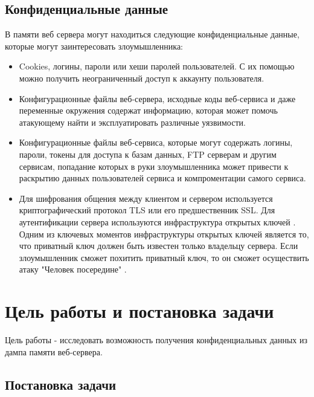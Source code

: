 \documentclass[20pt]{article}
\begin{document}
\subsection{Конфиденциальные данные}

В памяти веб сервера могут находиться следующие конфиденциальные данные, которые
могут заинтересовать злоумышленника:

\begin{itemize}

  \item Cookies, логины, пароли или хеши паролей пользователей. С их
  помощью можно получить неограниченный доступ к аккаунту пользователя.

  \item Конфигурационные файлы веб-сервера, исходные коды веб-сервиса и даже переменные
  окружения содержат информацию, которая может помочь атакующему найти и
  эксплуатировать различные уязвимости.

  \item Конфигурационные файлы веб-сервиса, которые могут содержать логины,
  пароли, токены для доступа к базам данных, FTP серверам и другим сервисам,
  попадание которых в руки злоумышленника может привести к раскрытию данных
  пользователей сервиса и компроментации самого сервиса.

  \item Для шифрования общения между клиентом и сервером используется криптографический
  протокол TLS \cite{tls} или его предшественник SSL. Для аутентификации сервера
  используются инфраструктура открытых ключей \cite{pki}. Одним из ключевых моментов
  инфраструктуры открытых ключей является то, что приватный ключ должен быть
  известен только владельцу сервера. Если злоумышленник сможет похитить приватный
  ключ, то он сможет осуществить атаку "Человек посередине" \cite{mitm}.

\end{itemize}

\newpage

\section{Цель работы и постановка задачи}

Цель работы - исследовать возможность получения конфиденциальных данных из
дампа памяти веб-сервера.

\subsection{Постановка задачи}
\end{document}
